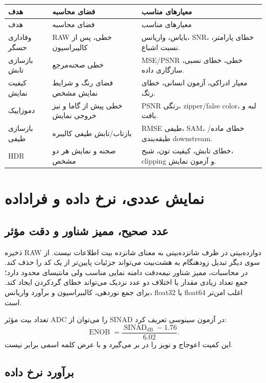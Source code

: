 \documentclass[12pt,openany,oneside]{book}
\begin{document}
\begin{longtable}{p{}p{}p{}}
\toprule
هدف & فضای محاسبه & معیارهای مناسب\\
\midrule
\endfirsthead
\toprule
هدف & فضای محاسبه & معیارهای مناسب\\
\midrule
\endhead
وفاداری حسگر & RAW خطی، پس از کالیبراسیون & بایاس، واریانس، SNR، خطای پارامتر، نسبت اشباع.\\
بازسازی تابش & خطی صحنه‌مرجع & MSE/PSNR خطی، خطای نسبی، سازگاری داده.\\
کیفیت نمایش & فضای رنگ و شرایط نمایش مشخص & معیار ادراکی، آزمون انسانی، خطای رنگ.\\
دموزاییک & خطی پیش از گاما و نیز خروجی نمایش & PSNR رنگی، zipper/false color، لبه و بافت.\\
بازسازی طیفی & بازتاب/تابش طیفی کالیبره & RMSE طیفی، SAM، خطای ماده/طبقه‌بندی downstream.\\
HDR & صحنه و نمایش هر دو مشخص & خطای تابش، کیفیت تون، شبح، clipping و آزمون نمایش.\\
\bottomrule
\end{longtable}


\section{نمایش عددی، نرخ داده و فراداده}

\subsection{عدد صحیح، ممیز شناور و دقت مؤثر}

ذخیره RAW دوازده‌بیتی در ظرف شانزده‌بیتی به معنای شانزده بیت اطلاعات نیست. از سوی دیگر تبدیل زودهنگام
به هشت‌بیت می‌تواند جزئیات پایین‌تر از یک کد را حذف کند. در محاسبات، ممیز شناور نیمه‌دقت
 دامنه نمایی مناسب ولی مانتیسای محدود دارد؛ جمع تعداد زیادی مقدار یا اختلاف دو عدد نزدیک
می‌تواند خطای گردکردن ایجاد کند. برای جمع نوردهی، کالیبراسیون و برآورد واریانس، float32 یا float64
اغلب امن‌تر است.

تعداد بیت مؤثر ADC را می‌توان از SINAD در آزمون سینوسی تعریف کرد:
\begin{equation}
\operatorname{ENOB}=\frac{\operatorname{SINAD}_{\mathrm{dB}}-1.76}{6.02}.
\end{equation}
این کمیت اعوجاج و نویز را در بر می‌گیرد و با عرض کلمه اسمی برابر نیست.

\subsection{برآورد نرخ داده}
\end{document}
